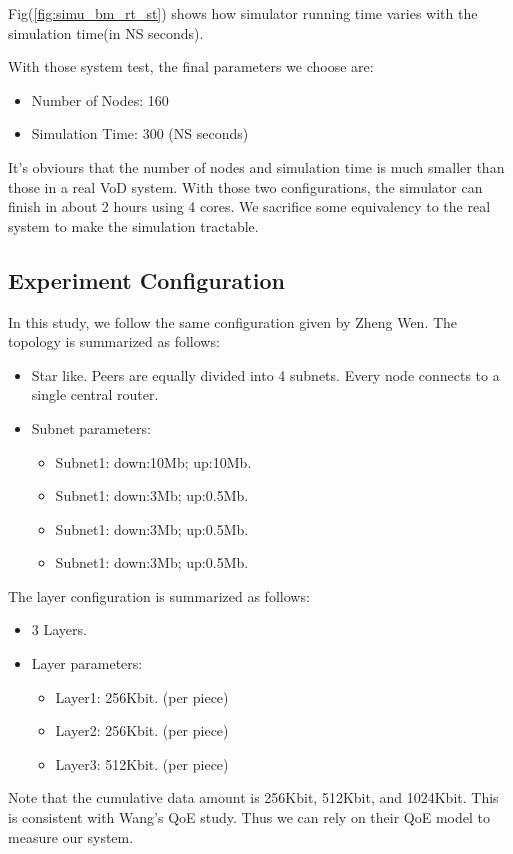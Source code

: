 \documentclass[11pt,a4paper]{article}
\begin{document}
Fig(\ref{fig:simu_bm_rt_st}) shows how simulator running time
varies with the simulation time(in NS seconds). 

With those system test, the final parameters we choose are:
\begin{itemize}
	\item Number of Nodes: 160
	\item Simulation Time: 300 (NS seconds)
\end{itemize}

It's obviours that the number of nodes and simulation time 
is much smaller than those in a real VoD system. With those 
two configurations, the simulator can finish in about 2 hours
using 4 cores. We sacrifice some equivalency to the real system 
to make the simulation tractable. 

\subsection{Experiment Configuration}

In this study, we follow the same configuration given by 
Zheng Wen. The topology is summarized as follows:
\begin{itemize}
	\item Star like. Peers are equally divided into 4 subnets.
	Every node connects to a single central router.  
	\item Subnet parameters:
		\begin{itemize}
			\item Subnet1: down:10Mb; up:10Mb. 
			\item Subnet1: down:3Mb; up:0.5Mb. 
			\item Subnet1: down:3Mb; up:0.5Mb. 
			\item Subnet1: down:3Mb; up:0.5Mb. 
		\end{itemize}
\end{itemize}

The layer configuration is summarized as follows:
\begin{itemize}
	\item 3 Layers. 
	\item Layer parameters:
		\begin{itemize}
			\item Layer1: 256Kbit. (per piece) 
			\item Layer2: 256Kbit. (per piece) 
			\item Layer3: 512Kbit. (per piece) 
		\end{itemize}
\end{itemize}
Note that the cumulative data amount is 256Kbit, 512Kbit, and 1024Kbit. 
This is consistent with Wang's QoE study\cite{wang2011-perceptual}. Thus
we can rely on their QoE model to measure our system. 
\end{document}
